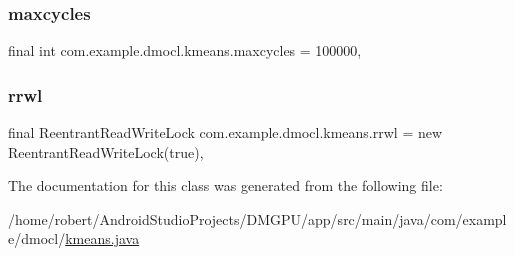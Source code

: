 \subsubsection{\texorpdfstring{maxcycles}{maxcycles}}
{\footnotesize\ttfamily final int com.\+example.\+dmocl.\+kmeans.\+maxcycles = 100000\hspace{0.3cm}{\ttfamily [static]}, {\ttfamily [package]}}

\mbox{\label{classcom_1_1example_1_1dmocl_1_1kmeans_a14088f43cd0164591d1fb9df377fc708}} 
\subsubsection{\texorpdfstring{rrwl}{rrwl}}
{\footnotesize\ttfamily final Reentrant\+Read\+Write\+Lock com.\+example.\+dmocl.\+kmeans.\+rrwl = new Reentrant\+Read\+Write\+Lock(true)\hspace{0.3cm}{\ttfamily [static]}, {\ttfamily [private]}}



The documentation for this class was generated from the following file\+:\begin{DoxyCompactItemize}
\item 
/home/robert/\+Android\+Studio\+Projects/\+D\+M\+G\+P\+U/app/src/main/java/com/example/dmocl/\mbox{\hyperlink{kmeans_8java}{kmeans.\+java}}\end{DoxyCompactItemize}
